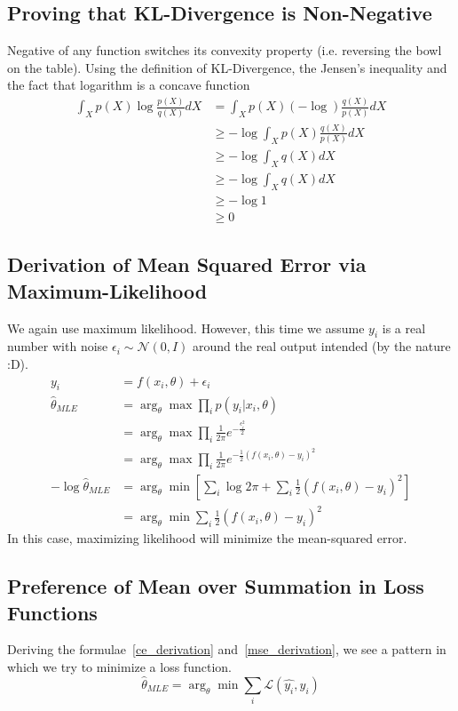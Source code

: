 \documentclass{article}
\numberwithin{equation}{subsection}
\begin{document}
\subsection{Proving that KL-Divergence is Non-Negative}
Negative of any function switches its convexity property (i.e. reversing the bowl on the table). Using the definition of KL-Divergence, the Jensen's inequality and the fact that logarithm is a concave function 
\begin{align}
     \int_X p(X)\log\frac{p(X)}{q(X)} dX &= \int_X p(X)(-\log)\frac{q(X)}{p(X)} dX\\
     &\geq -\log \int_X p(X)\frac{q(X)}{p(X)} dX\\
     &\geq -\log \int_X q(X) dX\\
     &\geq -\log \int_X q(X) dX\\
     &\geq -\log 1 \\
     &\geq 0
\end{align}
\subsection{Derivation of Mean Squared Error via Maximum-Likelihood}
We again use maximum likelihood. However, this time we assume $y_i$ is a real number with noise $\epsilon_i \sim \mathcal{N}(0, I)$ around the real output intended (by the nature :D).
\begin{align}
    y_i &= f(x_i,\theta)+\epsilon_i\\
    \hat{\theta}_{MLE} &= \arg_\theta \max \prod_i p(y_i|x_i,\theta)\\
    &= \arg_\theta \max \prod_i \frac{1}{2\pi}e^{-\frac{\epsilon_i^2}{2}}\\
    &= \arg_\theta \max \prod_i \frac{1}{2\pi}e^{-\frac{1}{2}(f(x_i,\theta)-y_i)^2}\\
    -\log\hat{\theta}_{MLE} &= \arg_\theta \min [\sum_i \log2\pi + \sum_i \frac{1}{2}(f(x_i,\theta)-y_i)^2]\\
    &= \arg_\theta \min \sum_i \frac{1}{2}(f(x_i,\theta)-y_i)^2
    \label{mse_derivation}
\end{align}
In this case, maximizing likelihood will minimize the mean-squared error.
\subsection{Preference of Mean over Summation in Loss Functions}
\label{mean_loss}
Deriving the formulae~\ref{ce_derivation} and~\ref{mse_derivation}, we see a pattern in which we try to minimize a loss function. 
\begin{equation}
    \hat{\theta}_{MLE} = \arg_\theta \min \sum_i \mathcal{L}(\hat{y_i},y_i)
\end{equation}
\end{document}
